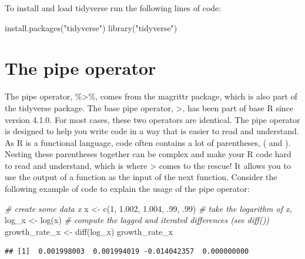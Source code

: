 \documentclass[
  12pt,
  oneside]{book}
\newenvironment{Shaded}{\begin{snugshade}}{\end{snugshade}}
\newcommand{\CommentTok}[1]{\textcolor[rgb]{0.56,0.35,0.01}{\textit{#1}}}
\newcommand{\DecValTok}[1]{\textcolor[rgb]{0.00,0.00,0.81}{#1}}
\newcommand{\FloatTok}[1]{\textcolor[rgb]{0.00,0.00,0.81}{#1}}
\newcommand{\FunctionTok}[1]{\textcolor[rgb]{0.00,0.00,0.00}{#1}}
\newcommand{\NormalTok}[1]{#1}
\newcommand{\OtherTok}[1]{\textcolor[rgb]{0.56,0.35,0.01}{#1}}
\newcommand{\StringTok}[1]{\textcolor[rgb]{0.31,0.60,0.02}{#1}}
\theoremstyle{definition}
\theoremstyle{definition}
\theoremstyle{definition}
\theoremstyle{definition}
\theoremstyle{remark}
\begin{document}
To install and load tidyverse run the following lines of code:

\begin{Shaded}
\begin{Highlighting}[]
\FunctionTok{install.packages}\NormalTok{(}\StringTok{"tidyverse"}\NormalTok{)}
\FunctionTok{library}\NormalTok{(}\StringTok{"tidyverse"}\NormalTok{)}
\end{Highlighting}
\end{Shaded}

\hypertarget{pipeoperator}{%
\section{The pipe operator}\label{pipeoperator}}

The pipe operator, \%\textgreater\%, comes from the magrittr package, which is also part of the tidyverse package. The base pipe operator, \textbar\textgreater, has been part of base R since version 4.1.0. For most cases, these two operators are identical. The pipe operator is designed to help you write code in a way that is easier to read and understand. As R is a functional language, code often contains a lot of parentheses, ( and ). Nesting these parentheses together can be complex and make your R code hard to read and understand, which is where \textbar\textgreater{} comes to the rescue! It allows you to use the output of a function as the input of the next function. Consider the following example of code to explain the usage of the pipe operator:

\begin{Shaded}
\begin{Highlighting}[]
\CommentTok{\# create some data \textasciigrave{}x\textasciigrave{}}
\NormalTok{x }\OtherTok{\textless{}{-}} \FunctionTok{c}\NormalTok{(}\DecValTok{1}\NormalTok{, }\FloatTok{1.002}\NormalTok{, }\FloatTok{1.004}\NormalTok{, .}\DecValTok{99}\NormalTok{, .}\DecValTok{99}\NormalTok{)}
\CommentTok{\# take the logarithm of \textasciigrave{}x\textasciigrave{}, }
\NormalTok{log\_x }\OtherTok{\textless{}{-}} \FunctionTok{log}\NormalTok{(x)}
\CommentTok{\# compute the lagged and iterated differences (see \textasciigrave{}diff()\textasciigrave{})}
\NormalTok{growth\_rate\_x }\OtherTok{\textless{}{-}} \FunctionTok{diff}\NormalTok{(log\_x)}
\NormalTok{growth\_rate\_x}
\end{Highlighting}
\end{Shaded}

\begin{verbatim}
## [1]  0.001998003  0.001994019 -0.014042357  0.000000000
\end{verbatim}
\end{document}
